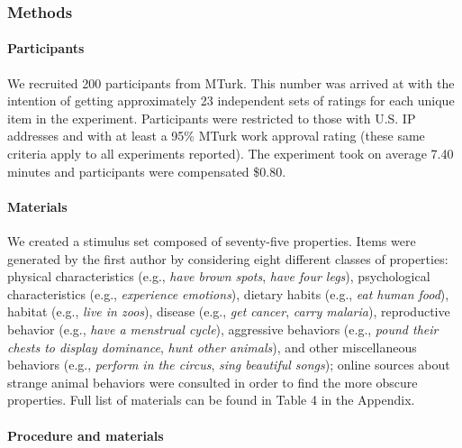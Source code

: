 \documentclass[floatsintext,doc]{apa6}
\let\oldparagraph\paragraph
\renewcommand{\paragraph}[1]{\oldparagraph{#1}\mbox{}}
\begin{document}
\hypertarget{methods}{%
\subsubsection{Methods}\label{methods}}

\hypertarget{participants-1}{%
\paragraph{Participants}\label{participants-1}}

We recruited 200 participants from MTurk.
This number was arrived at with the intention of getting approximately 23 independent sets of ratings for each unique item in the experiment.
Participants were restricted to those with U.S. IP addresses and with at least a 95\% MTurk work approval rating (these same criteria apply to all experiments reported).
The experiment took on average 7.40 minutes and participants were compensated \$0.80.

\hypertarget{materials}{%
\paragraph{Materials}\label{materials}}

We created a stimulus set composed of seventy-five properties.
Items were generated by the first author by considering eight different classes of properties: physical characteristics (e.g., \emph{have brown spots}, \emph{have four legs}), psychological characteristics (e.g., \emph{experience emotions}), dietary habits (e.g., \emph{eat human food}), habitat (e.g., \emph{live in zoos}), disease (e.g., \emph{get cancer}, \emph{carry malaria}), reproductive behavior (e.g., \emph{have a menstrual cycle}), aggressive behaviors (e.g., \emph{pound their chests to display dominance}, \emph{hunt other animals}), and other miscellaneous behaviors (e.g., \emph{perform in the circus}, \emph{sing beautiful songs}); online sources about strange animal behaviors were consulted in order to find the more obscure properties. Full list of materials can be found in Table 4 in the Appendix.

\hypertarget{procedure-and-materials-1}{%
\paragraph{Procedure and materials}\label{procedure-and-materials-1}}
\end{document}

